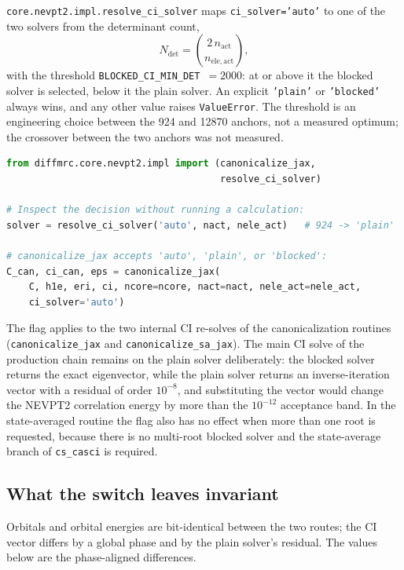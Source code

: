 \texttt{core.nevpt2.impl.resolve\_ci\_solver} maps
\texttt{ci\_solver='auto'} to one of the two solvers from the
determinant count,
\begin{equation}
  N_{\mathrm{det}} = \binom{2\,n_{\mathrm{act}}}{n_{\mathrm{ele,act}}},
\end{equation}
with the threshold \texttt{BLOCKED\_CI\_MIN\_DET}~$=2000$: at or above
it the blocked solver is selected, below it the plain solver.  An
explicit \texttt{'plain'} or \texttt{'blocked'} always wins, and any
other value raises \texttt{ValueError}.  The threshold is an
engineering choice between the 924 and 12870 anchors, not a measured
optimum; the crossover between the two anchors was not measured.

\begin{lstlisting}[language=Python]
from diffmrc.core.nevpt2.impl import (canonicalize_jax,
                                      resolve_ci_solver)

# Inspect the decision without running a calculation:
solver = resolve_ci_solver('auto', nact, nele_act)   # 924 -> 'plain'

# canonicalize_jax accepts 'auto', 'plain', or 'blocked':
C_can, ci_can, eps = canonicalize_jax(
    C, h1e, eri, ci, ncore=ncore, nact=nact, nele_act=nele_act,
    ci_solver='auto')
\end{lstlisting}

The flag applies to the two internal CI re-solves of the
canonicalization routines (\texttt{canonicalize\_jax} and
\texttt{canonicalize\_sa\_jax}).  The main CI solve of the production
chain remains on the plain solver deliberately: the blocked solver
returns the exact eigenvector, while the plain solver returns an
inverse-iteration vector with a residual of order $10^{-8}$, and
substituting the vector would change the NEVPT2 correlation energy by
more than the $10^{-12}$ acceptance band.  In the state-averaged
routine the flag also has no effect when more than one root is
requested, because there is no multi-root blocked solver and the
state-average branch of \texttt{cs\_casci} is required.

\subsection{What the switch leaves invariant}

Orbitals and orbital energies are bit-identical between the two routes;
the CI vector differs by a global phase and by the plain solver's
residual.  The values below are the phase-aligned differences.

